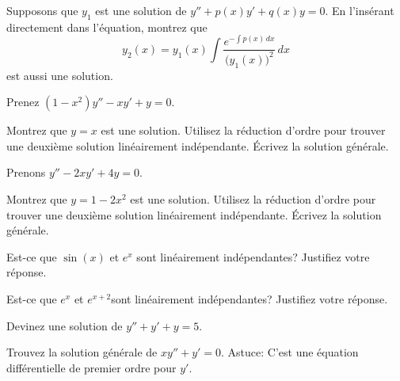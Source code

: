 \begin{exercise} \label{exercise:reductionoforder}
Supposons que $y_1$ est une solution de $y'' + p(x) y' + q(x) y = 0$.
En l'insérant directement dans l'équation, montrez que 
\begin{equation*}
y_2(x) = y_1(x) \int \frac{e^{-\int p(x)\,dx}}{{\bigl(y_1(x)\bigr)}^2} \,dx
\end{equation*}
est aussi une solution.
\end{exercise}

\begin{exercise}
Prenez
$(1-x^2)y''-xy' + y = 0$.
\begin{tasks}
\task Montrez que $y=x$ est une solution.
\task Utilisez la réduction d'ordre pour trouver une deuxième solution linéairement indépendante.
\task Écrivez la solution générale. 
\end{tasks}
\end{exercise}

\begin{exercise}
Prenons
$y''-2xy' + 4y = 0$.
\begin{tasks}
\task Montrez que  $y=1-2x^2$ est une solution.
\task Utilisez la réduction d'ordre pour trouver une deuxième solution linéairement indépendante.
\task Écrivez la solution générale.
\end{tasks}
\end{exercise}

\setcounter{exercise}{100}

\begin{exercise}
Est-ce que $\sin(x)$ et $e^x$ sont linéairement indépendantes?  Justifiez votre réponse.
\end{exercise}

\begin{exercise}
Est-ce que  $e^x$ et $e^{x+2}$sont linéairement indépendantes?  Justifiez votre réponse.
\end{exercise}

\begin{exercise}
Devinez une solution de $y'' + y' + y= 5$.
\end{exercise}

\begin{exercise}
Trouvez la solution générale de
$x y'' + y' = 0$.  Astuce: C'est une équation différentielle de premier ordre pour $y'$.
\end{exercise}

